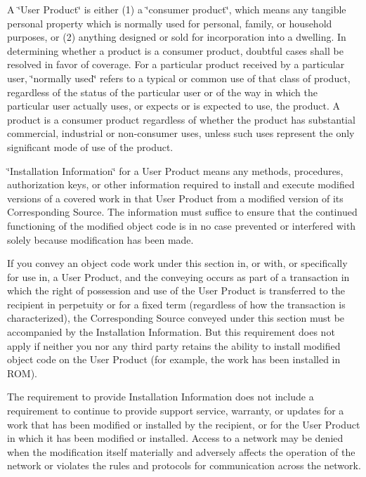 A \char`\"{}\+User Product\char`\"{} is either (1) a \char`\"{}consumer product\char`\"{}, which means any tangible personal property which is normally used for personal, family, or household purposes, or (2) anything designed or sold for incorporation into a dwelling. In determining whether a product is a consumer product, doubtful cases shall be resolved in favor of coverage. For a particular product received by a particular user, \char`\"{}normally used\char`\"{} refers to a typical or common use of that class of product, regardless of the status of the particular user or of the way in which the particular user actually uses, or expects or is expected to use, the product. A product is a consumer product regardless of whether the product has substantial commercial, industrial or non-\/consumer uses, unless such uses represent the only significant mode of use of the product.

\char`\"{}\+Installation Information\char`\"{} for a User Product means any methods, procedures, authorization keys, or other information required to install and execute modified versions of a covered work in that User Product from a modified version of its Corresponding Source. The information must suffice to ensure that the continued functioning of the modified object code is in no case prevented or interfered with solely because modification has been made.

If you convey an object code work under this section in, or with, or specifically for use in, a User Product, and the conveying occurs as part of a transaction in which the right of possession and use of the User Product is transferred to the recipient in perpetuity or for a fixed term (regardless of how the transaction is characterized), the Corresponding Source conveyed under this section must be accompanied by the Installation Information. But this requirement does not apply if neither you nor any third party retains the ability to install modified object code on the User Product (for example, the work has been installed in R\+OM).

The requirement to provide Installation Information does not include a requirement to continue to provide support service, warranty, or updates for a work that has been modified or installed by the recipient, or for the User Product in which it has been modified or installed. Access to a network may be denied when the modification itself materially and adversely affects the operation of the network or violates the rules and protocols for communication across the network.

